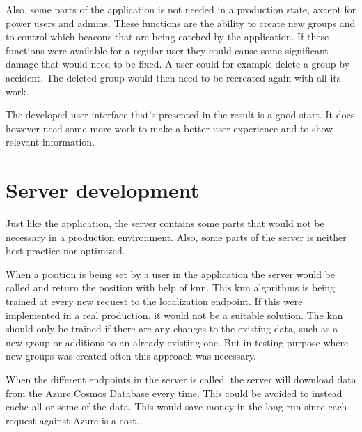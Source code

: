 \bigskip

Also, some parts of the application is not needed in a production state, axcept for power users and admins.
These functions are the ability to create new groups and to control which beacons that are being catched by the application.
If these functions were available for a regular user they could cause some significant damage that would need to be fixed.
A user could for example delete a group by accident.
The deleted group would then need to be recreated again with all its work. 

\bigskip

The developed user interface that's presented in the result is a good start.
It does however need some more work to make a better user experience and to show relevant information.


\section{Server development}\label{sec:}
Just like the application, the server contains some parts that would not be necessary in a production environment.
Also, some parts of the server is neither best practice nor optimized.

\bigskip

When a position is being set by a user in the application the server would be called and return the position with help of \acrfull{knn}.
This \acrshort{knn} algorithms is being trained at every new request to the localization endpoint.
If this were implemented in a real production, it would not be a suitable solution.
The \acrshort{knn} should only be trained if there are any changes to the existing data, such as a new group or additions to an already existing one.
But in testing purpose where new groups was created often this approach was necessary.

\bigskip

When the different endpoints in the server is called, the server will download data from the Azure Cosmos Database every time. 
This could be avoided to instead cache all or some of the data.
This would save money in the long run since each request against Azure is a cost.



